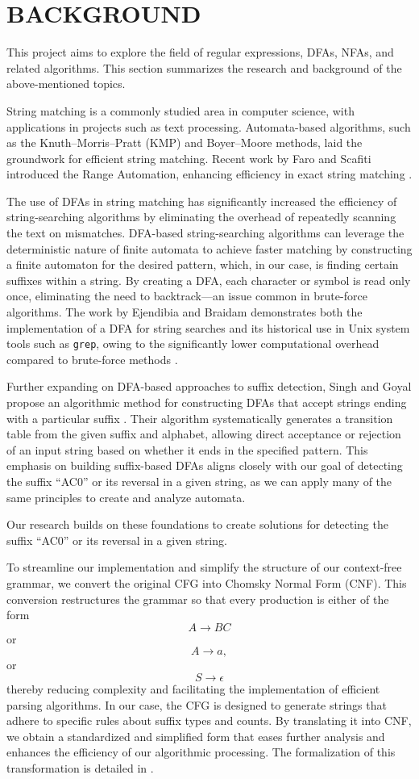 \documentclass[sigconf,anonymous,review]{acmart}
\begin{document}
\section{BACKGROUND} \label{Background}
This project aims to explore the field of regular expressions, DFAs, NFAs, and related algorithms. This section summarizes the research and background of the above-mentioned topics.

String matching is a commonly studied area in computer science, with applications in projects such as text processing. Automata-based algorithms, such as the Knuth–Morris–Pratt (KMP) and Boyer–Moore methods, laid the groundwork for efficient string matching. Recent work by Faro and Scafiti introduced the Range Automation, enhancing efficiency in exact string matching \cite{FARO202288}.

The use of DFAs in string matching has significantly increased the efficiency of string-searching algorithms by eliminating the overhead of repeatedly scanning the text on mismatches. DFA-based string-searching algorithms can leverage the deterministic nature of finite automata to achieve faster matching by constructing a finite automaton for the desired pattern, which, in our case, is finding certain suffixes within a string. By creating a DFA, each character or symbol is read only once, eliminating the need to backtrack—an issue common in brute-force algorithms. The work by Ejendibia and Braidam demonstrates both the implementation of a DFA for string searches and its historical use in Unix system tools such as \texttt{grep}, owing to the significantly lower computational overhead compared to brute-force methods \cite{ejendibia_string_2015}.

Further expanding on DFA-based approaches to suffix detection, Singh and Goyal propose an algorithmic method for constructing DFAs that accept strings ending with a particular suffix \cite{kamalpreet_algorithm_2019}. Their algorithm systematically generates a transition table from the given suffix and alphabet, allowing direct acceptance or rejection of an input string based on whether it ends in the specified pattern. This emphasis on building suffix-based DFAs aligns closely with our goal of detecting the suffix “AC0” or its reversal in a given string, as we can apply many of the same principles to create and analyze automata.

Our research builds on these foundations to create solutions for detecting the suffix “AC0” or its reversal in a given string.

To streamline our implementation and simplify the structure of our context‐free grammar, we convert the original CFG into Chomsky Normal Form (CNF). This conversion restructures the grammar so that every production is either of the form
\[
A \to BC
\]
or
\[
A \to a,
\]
or
\[
S \to \epsilon
\]
thereby reducing complexity and facilitating the implementation of efficient parsing algorithms. In our case, the CFG is designed to generate strings that adhere to specific rules about suffix types and counts. By translating it into CNF, we obtain a standardized and simplified form that eases further analysis and enhances the efficiency of our algorithmic processing. The formalization of this transformation is detailed in \cite{ramos_formalization_2015}.
\end{document}
